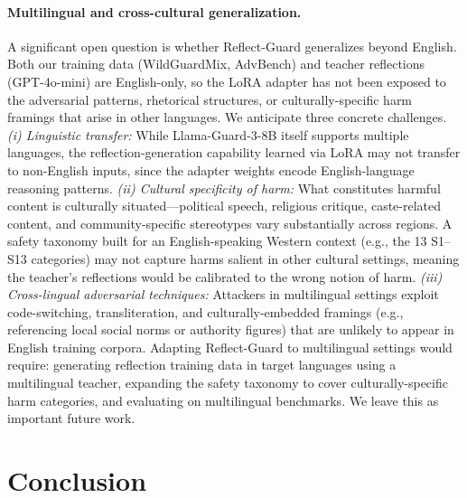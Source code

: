 \documentclass[11pt]{article}
\begin{document}
\paragraph{Multilingual and cross-cultural generalization.}
A significant open question is whether Reflect-Guard generalizes beyond English. Both our training data (WildGuardMix, AdvBench) and teacher reflections (GPT-4o-mini) are English-only, so the LoRA adapter has not been exposed to the adversarial patterns, rhetorical structures, or culturally-specific harm framings that arise in other languages. We anticipate three concrete challenges. \emph{(i) Linguistic transfer:} While Llama-Guard-3-8B itself supports multiple languages, the reflection-generation capability learned via LoRA may not transfer to non-English inputs, since the adapter weights encode English-language reasoning patterns. \emph{(ii) Cultural specificity of harm:} What constitutes harmful content is culturally situated---political speech, religious critique, caste-related content, and community-specific stereotypes vary substantially across regions. A safety taxonomy built for an English-speaking Western context (e.g., the 13 S1--S13 categories) may not capture harms salient in other cultural settings, meaning the teacher's reflections would be calibrated to the wrong notion of harm. \emph{(iii) Cross-lingual adversarial techniques:} Attackers in multilingual settings exploit code-switching, transliteration, and culturally-embedded framings (e.g., referencing local social norms or authority figures) that are unlikely to appear in English training corpora. Adapting Reflect-Guard to multilingual settings would require: generating reflection training data in target languages using a multilingual teacher, expanding the safety taxonomy to cover culturally-specific harm categories, and evaluating on multilingual benchmarks. We leave this as important future work.

\section{Conclusion}
\end{document}

